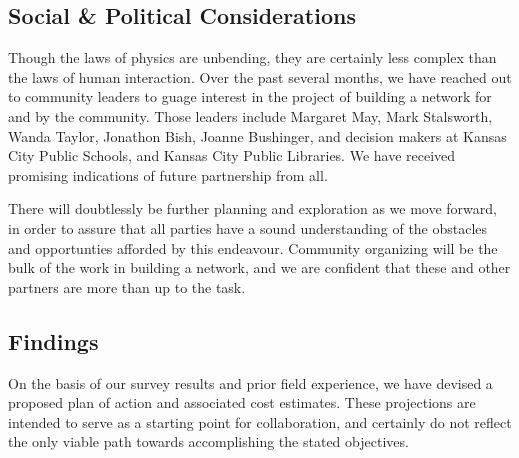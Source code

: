 \subsection{Social \& Political Considerations}
Though the laws of physics are unbending, they are certainly less complex than the laws of
human interaction. Over the past several months, we have reached out to community leaders
to guage interest in the project of building a network for and by the community. Those leaders
include Margaret May, Mark Stalsworth, Wanda Taylor, Jonathon Bish, Joanne Bushinger, and
decision makers at Kansas City Public Schools, and Kansas City Public Libraries. We have
received promising indications of future partnership from all. \par
There will doubtlessly be further planning and exploration as we move forward, in order to
assure that all parties have a sound understanding of the obstacles and opportunties afforded
by this endeavour. Community organizing will be the bulk of the work in building a network,
and we are confident that these and other partners are more than up to the task.

\subsection{Findings}
On the basis of our survey results and prior field experience, we have devised
a proposed plan of action and associated cost estimates. These projections are intended
to serve as a starting point for collaboration, and certainly do not reflect the
only viable path towards accomplishing the stated objectives.\par
